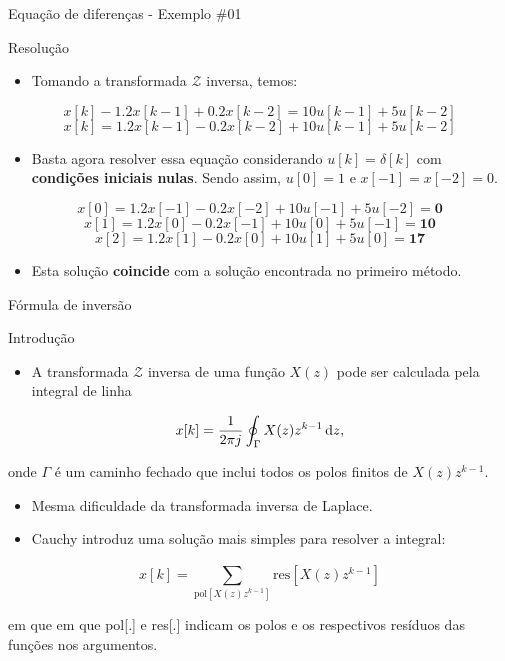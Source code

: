 \begin{frame}{Equação de diferenças - Exemplo \#01}
\begin{block}{Resolução}
\begin{itemize}
    \item Tomando a transformada $\mathcal{Z}$ inversa, temos:
\end{itemize}
	\[x[k]-\num{1.2}x[k-1]+\num{0.2}x[k-2]=10u[k-1]+5u[k-2]\]
	\[x[k]=\num{1.2}x[k-1]-\num{0.2}x[k-2]+10u[k-1]+5u[k-2]\]
\begin{itemize}
    \item Basta agora resolver essa equação considerando $u[k] = \delta[k]$ com \textbf{condições iniciais nulas}. Sendo assim, $u[0] = 1$ e $x[-1] = x[-2] = 0$. 
\end{itemize}

    $$x[0] = \num{1.2}x[-1] - \num{0.2}x[-2] + 10u[-1] + 5u[-2] = \bm{0}$$
    $$x[1] = \num{1.2}x[0] - \num{0.2}x[-1] + 10u[0] + 5u[-1] = \bm{10}$$   
    $$x[2] = \num{1.2}x[1] - \num{0.2}x[0] + 10u[1] + 5u[0] = \bm{17}$$

\begin{itemize}
    \item Esta solução \textbf{coincide} com a solução encontrada no primeiro método.
\end{itemize}
\end{block}
\end{frame}

\begin{frame}{Fórmula de inversão}
\begin{block}{Introdução}
\begin{itemize}
	\item A transformada $\mathcal{Z}$ inversa de uma função $X(z)$ pode ser calculada pela integral de linha
\end{itemize}

	\[ x[k]=\dfrac{1}{2\pi j}\oint_{\Gamma} X(z)z^{k-1}\dif z, \]

onde $\Gamma$ é um caminho fechado que inclui todos os polos finitos de $X(z)z^{k-1}$.

\begin{itemize}
	\item Mesma dificuldade da transformada inversa de Laplace.
	\item Cauchy introduz uma solução mais simples para resolver a integral:
\end{itemize}
$$x[k] = \sum_{\text{pol}\left[X(z)z^{k-1}\right]}^{} \text{res}\left[X(z)z^{k-1}\right]$$

em que em que pol[.] e res[.] indicam os polos e  os respectivos resíduos das funções nos argumentos.
\end{block}
\end{frame}

